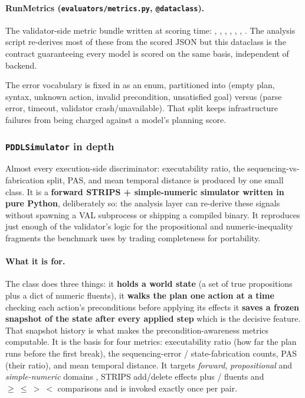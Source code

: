 \paragraph{RunMetrics (\texttt{evaluators/metrics.py}, \texttt{@dataclass}).} The
validator-side metric bundle written at scoring time: ,
, , ,
, , . The analysis
script re-derives most of these from the scored JSON but this dataclass is the
contract guaranteeing every model is scored on the same basis, independent of
backend.

The error vocabulary is fixed in  as an
 enum, partitioned into  (empty plan,
syntax, unknown action, invalid precondition, unsatisfied goal) versus
 (parse error, timeout, validator crash/unavailable).
That split keeps infrastructure failures from being charged against a model's
planning score.

\subsubsection{\texorpdfstring{\texttt{PDDLSimulator}}{PDDLSimulator} in depth}
\label{sec:sim}

Almost every execution-side discriminator: executability ratio, the
sequencing-vs-fabrication split, PAS, and mean temporal distance is produced
by one small class. It is a \textbf{forward STRIPS + simple-numeric simulator
written in pure Python}, deliberately so: the analysis layer can re-derive these
signals without spawning a VAL subprocess or shipping a compiled binary. It
reproduces just enough of the validator's logic for the propositional and
numeric-inequality fragments the benchmark uses by trading completeness for
portability.

\paragraph{What it is for.} The class does three things: it \textbf{holds a
world state} (a set of true propositions plus a dict of numeric fluents), it
\textbf{walks the plan one action at a time} checking each action's preconditions before applying its effects it
\textbf{saves a frozen snapshot of the state after every applied step} which is the decisive feature. That
snapshot history is what makes the precondition-awareness metrics computable. It
is the basis for four metrics: executability ratio (how far the plan runs before
the first break), the sequencing-error / state-fabrication counts, PAS (their
ratio), and mean temporal distance. It targets \emph{forward},
\emph{propositional} and \emph{simple-numeric} domains , STRIPS add/delete
effects plus / fluents and
$\geq\ \leq\ >\ <$ comparisons and is invoked exactly once per
 pair.


